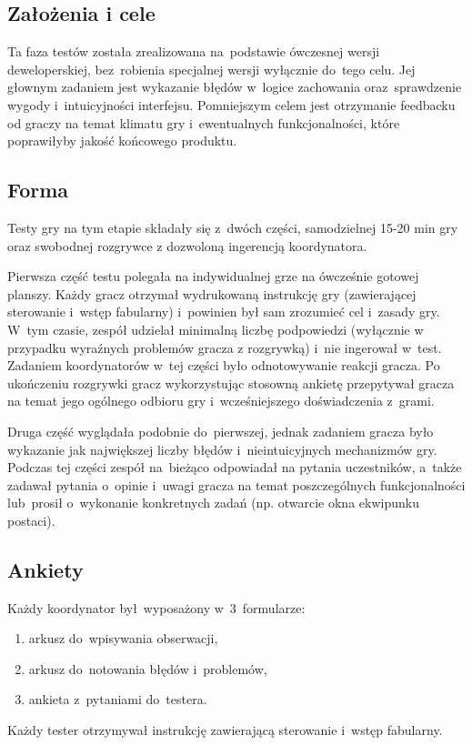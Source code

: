 \documentclass[licencjacka]{pracamgr}
\begin{document}
      \subsection{Założenia i cele}
      Ta faza testów została zrealizowana na~podstawie ówczesnej wersji deweloperskiej, 
      bez~robienia specjalnej wersji wyłącznie do~tego celu. Jej głownym zadaniem jest 
      wykazanie błędów w~logice zachowania oraz~sprawdzenie wygody i~intuicyjności interfejsu. 
      Pomniejszym celem jest otrzymanie feedbacku od graczy na temat klimatu gry
      i~ewentualnych funkcjonalności, które poprawiłyby jakość końcowego produktu.
      
      \subsection{Forma}
      Testy gry na tym etapie składały się z~dwóch części, samodzielnej 15-20 min gry
      oraz swobodnej rozgrywce z dozwoloną ingerencją koordynatora.
      
      Pierwsza część testu polegała na indywidualnej grze na ówcześnie gotowej planszy.
      Każdy gracz otrzymał wydrukowaną instrukcję gry (zawierającej sterowanie i~wstęp fabularny)
      i~powinien był sam zrozumieć cel i~zasady gry. W~tym czasie, zespół udzielał minimalną liczbę
      podpowiedzi (wyłącznie w przypadku wyraźnych problemów gracza z rozgrywką) i~nie ingerował w~test.
      Zadaniem koordynatorów w~tej części było odnotowywanie reakcji gracza. 
      Po ukończeniu rozgrywki gracz wykorzystując stosowną ankietę przepytywał gracza na temat 
      jego ogólnego odbioru gry i~wcześniejszego doświadczenia z~grami. 
      
      Druga część wyglądała podobnie do~pierwszej, jednak zadaniem gracza było wykazanie 
      jak największej liczby błędów i~nieintuicyjnych mechanizmów gry. 
      Podczas tej części zespół na~bieżąco odpowiadał na pytania uczestników,
      a~także zadawał pytania o~opinie i~uwagi gracza na temat poszczególnych funkcjonalności
      lub~prosił o~wykonanie konkretnych zadań (np. otwarcie okna ekwipunku postaci).

      \subsection{Ankiety}
      Każdy koordynator był~wyposażony w~3~formularze:
      \begin{enumerate}
	\item arkusz do~wpisywania obserwacji,
	\item arkusz do~notowania błędów i~problemów,
	\item ankieta z~pytaniami do~testera.
      \end{enumerate}
      Każdy tester otrzymywał instrukcję zawierającą sterowanie i~wstęp fabularny.
      
\end{document}

